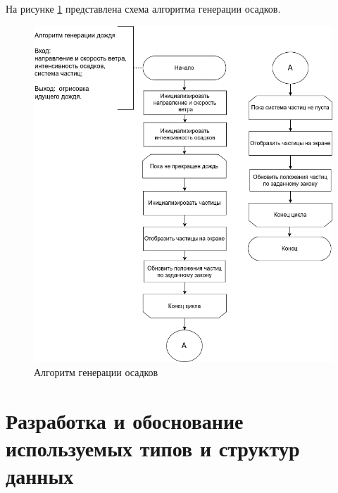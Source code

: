 На рисунке \ref{img:r3} представлена схема алгоритма генерации осадков.
\begin{figure}[H]
	\centering
	\includegraphics[scale=0.55]{include/rain.png}
	\caption{Алгоритм генерации осадков}
	\label{img:r3}
\end{figure} 

\section{Разработка и обоснование используемых типов и структур данных}

